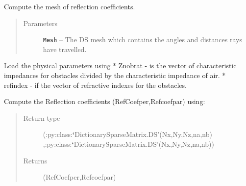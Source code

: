 \documentclass[letterpaper,10pt,english]{sphinxmanual}
\begin{document}
\begin{fulllineitems}
\label{index:RayTracerMainProgram.RefCoefComputation}
Compute the mesh of reflection coefficients.
\begin{quote}\begin{description}
\item[{Parameters}] \leavevmode
\textbf{\texttt{Mesh}} -- The DS mesh which contains the angles and distances rays   have travelled.

\end{description}\end{quote}

Load the physical parameters using   {\hyperref[index:ParameterInput.ObstacleCoefficients]{}}
* Znobrat - is the vector of characteristic impedances for obstacles   divided by the characteristic impedance of air.
* refindex - if the vector of refractive indexes for the obstacles.

Compute the Reflection coefficients (RefCoefper,Refcoefpar) using:
{\hyperref[index:DictionarySparseMatrix.ref_coef]{}}
\begin{quote}\begin{description}
\item[{Return type}] \leavevmode
(:py:class:{\color{red}\bfseries{}{}`}DictionarySparseMatrix.DS'(Nx,Ny,Nz,na,nb)  ,:py:class:{\color{red}\bfseries{}{}`}DictionarySparseMatrix.DS'(Nx,Ny,Nz,na,nb))

\item[{Returns}] \leavevmode
(RefCoefper,Refcoefpar)

\end{description}\end{quote}

\end{fulllineitems}

\end{document}
